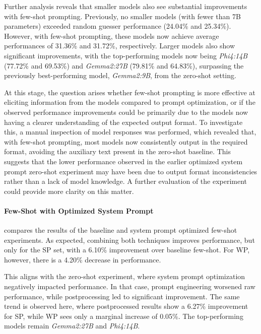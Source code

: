 Further analysis reveals that smaller models also see substantial improvements with few-shot prompting. Previously, no smaller models (with fewer than 7B parameters) exceeded random guesser performance (24.04\% and 25.34\%). However, with few-shot prompting, these models now achieve average performances of 31.36\% and 31.72\%, respectively. Larger models also show significant improvements, with the top-performing models now being \textit{Phi4:14B} (77.72\% and 69.53\%) and \textit{Gemma2:27B} (79.81\% and 64.83\%), surpassing the previously best-performing model, \textit{Gemma2:9B}, from the zero-shot setting.

At this stage, the question arises whether few-shot prompting is more effective at eliciting information from the models compared to prompt optimization, or if the observed performance improvements could be primarily due to the models now having a clearer understanding of the expected output format. To investigate this, a manual inspection of model responses was performed, which revealed that, with few-shot prompting, most models now consistently output in the required format, avoiding the auxiliary text present in the zero-shot baseline. This suggests that the lower performance observed in the earlier optimized system prompt zero-shot experiment may have been due to output format inconsistencies rather than a lack of model knowledge. A further evaluation of the  experiment could provide more clarity on this matter.

\paragraph{Few-Shot with Optimized System Prompt}

 compares the results of the baseline and system prompt optimized few-shot experiments. As expected, combining both techniques improves performance, but only for the \ac{SP} set, with a 6.10\% improvement over baseline few-shot. For \ac{WP}, however, there is a 4.20\% decrease in performance.

This aligns with the zero-shot experiment, where system prompt optimization negatively impacted performance. In that case, prompt engineering worsened raw performance, while postprocessing led to significant improvement. The same trend is observed here, where postprocessed results show a 6.27\% improvement for \ac{SP}, while \ac{WP} sees only a marginal increase of 0.05\%. The top-performing models remain \textit{Gemma2:27B} and \textit{Phi4:14B}.

